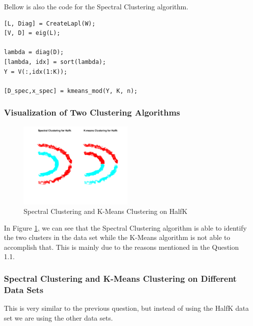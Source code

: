 \documentclass[unicode,11pt,a4paper,oneside,numbers=endperiod,openany]{scrartcl}
\begin{document}
Bellow is also the code for the Spectral Clustering algorithm.

\begin{lstlisting}
[L, Diag] = CreateLapl(W);
[V, D] = eig(L);

lambda = diag(D);
[lambda, idx] = sort(lambda);
Y = V(:,idx(1:K));

[D_spec,x_spec] = kmeans_mod(Y, K, n);
\end{lstlisting}

\subsubsection{Visualization of Two Clustering Algorithms}

\begin{figure}[H]
    \centering
    \includegraphics[width=0.5\textwidth]{figures/1.7.png}
    \caption{Spectral Clustering and K-Means Clustering on HalfK}
    \label{fig:1.7}
\end{figure}

In Figure \ref{fig:1.7}, we can see that the Spectral Clustering algorithm is able to identify the two clusters in the data set while the K-Means algorithm is not able to accomplish that. This is mainly due to the reasons mentioned in the Question 1.1.

\subsubsection{Spectral Clustering and K-Means Clustering on Different Data Sets}
This is very similar to the previous question, but instead of using the HalfK data set we are using the other data sets.
\end{document}

